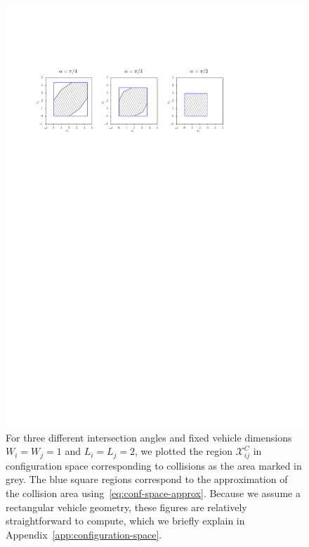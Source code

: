 \documentclass[a4paper]{report}
\theoremstyle{definition}
\theoremstyle{plain}
\begin{document}
\begin{figure}
  \centering
  \includegraphics[scale=1]{figures/intersection-config-spaces}
  \caption{For three different intersection angles and fixed vehicle dimensions
    $W_{i} = W_{j} = 1$ and $L_{i} = L_{j} = 2$, we plotted the region
    $\mathcal{X}_{ij}^{C}$ in configuration space corresponding to collisions as
    the area marked in grey. The blue square regions correspond to the
    approximation of the collision area using~\eqref{eq:conf-space-approx}. Because we assume a
    rectangular vehicle geometry, these figures are relatively straightforward
    to compute, which we briefly explain in
    Appendix~\ref{app:configuration-space}.}%
  \label{fig:intersection-config-spaces}
\end{figure}
\end{document}
